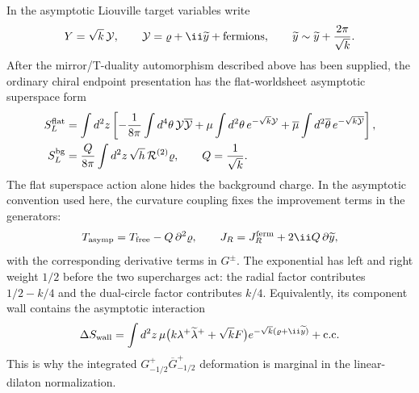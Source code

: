 In the asymptotic Liouville target variables write
\[
  Y=\sqrt{k}\,{\mathcal Y},
  \qquad
  {\mathcal Y}=\varrho+\ii\widetilde y+\hbox{fermions},
  \qquad
  \widetilde y\sim\widetilde y+\frac{2\pi}{\sqrt{k}} .
\]
After the mirror/T-duality automorphism described above has been supplied, the
ordinary chiral endpoint presentation has the flat-worldsheet asymptotic
superspace form
\begin{align}
  S_L^{\rm flat}
  &=
  \int d^2z
  \left[
  -\frac1{8\pi}\int d^4\theta\,{\mathcal Y}\overline{\mathcal Y}
  +
  \mu\int d^2\theta\,e^{-\sqrt{k}{\mathcal Y}}
  +
  \overline\mu\int d^2\overline\theta\,
  e^{-\sqrt{k}\overline{\mathcal Y}}
  \right],
  \label{eq:n2-liouville-normalized-action}\\
  S_L^{\rm bg}
  &=
  \frac{Q}{8\pi}\int d^2z\,\sqrt h\,\mathcal R^{(2)}\varrho,
  \qquad
  Q=\frac1{\sqrt{k}} .
  \label{eq:n2-liouville-background-charge}
\end{align}
The flat superspace action alone hides the background charge.  In the
asymptotic convention used here, the curvature coupling fixes the improvement
terms in the generators:
\[
  T_{\rm asymp}=T_{\rm free}-Q\,\partial^2\varrho,
  \qquad
  J_R=J_R^{\rm ferm}+2\ii Q\,\partial\widetilde y,
\]
with the corresponding derivative terms in \(G^\pm\).  The exponential has
left and right weight \(1/2\) before the two supercharges act: the radial
factor contributes \(1/2-k/4\) and the dual-circle factor contributes
\(k/4\).  Equivalently, its component wall contains the asymptotic interaction
\[
  \Delta S_{\rm wall}
  =
  \int d^2z\,
  \mu\bigl(k\lambda^+\widetilde\lambda^+
  +\sqrt{k}F\bigr)e^{-\sqrt{k}(\varrho+\ii\widetilde y)}
  +\text{c.c.}
\]
This is why the integrated \(G_{-1/2}^+\overline G_{-1/2}^+\) deformation is
marginal in the linear-dilaton normalization.

